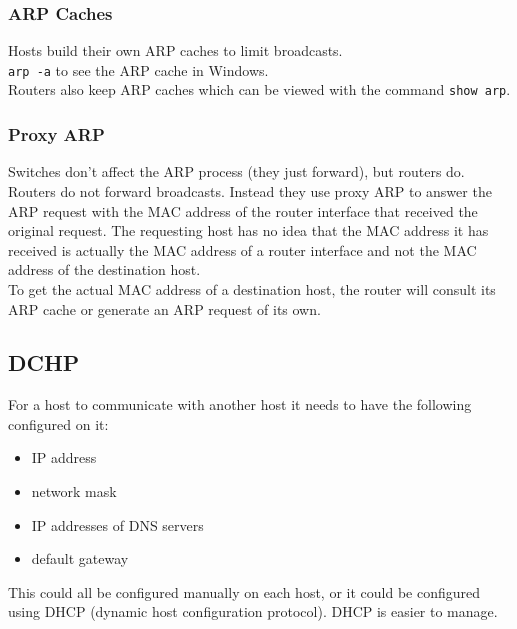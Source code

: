 \subsubsection{ARP Caches}

Hosts build their own ARP caches to limit broadcasts.\\

\texttt{arp -a} to see the ARP cache in Windows.\\

Routers also keep ARP caches which can be viewed with the command
\texttt{show arp}.

\subsubsection{Proxy ARP}

Switches don't affect the ARP process (they just forward), but routers do.\\

Routers do not forward broadcasts. Instead they use proxy ARP to answer the
ARP request with the MAC address of the router interface that received the
original request. The requesting host has no idea that the MAC address it
has received is actually the MAC address of a router interface and not the
MAC address of the destination host.\\

To get the actual MAC address of a destination host, the router will consult
its ARP cache or generate an ARP request of its own.

\subsection{DCHP}

For a host to communicate with another host it needs to have the following
configured on it:\\

\begin{itemize}

\item IP address
\item network mask
\item IP addresses of DNS servers
\item default gateway

\end{itemize}

This could all be configured manually on each host, or it could be configured
using DHCP (dynamic host configuration protocol). DHCP is easier to manage.

